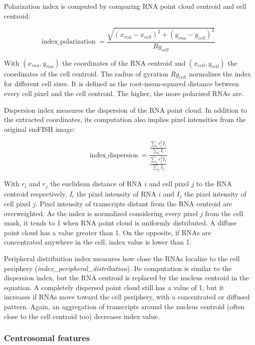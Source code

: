 Polarization index is computed by comparing \ac{RNA} point cloud centroid and cell centroid:

\begin{equation}
	{\displaystyle \operatorname{index\_polarization} = \frac{\sqrt{(x_{rna} - x_{cell})^2 + (y_{rna} - y_{cell})^2}}{Rg_{cell}}}
\end{equation}

\noindent
With $(x_{rna}, y_{rna})$ the coordinates of the \ac{RNA} centroid and $(x_{cell}, y_{cell})$ the coordinates of the cell centroid.
The radius of gyration $Rg_{cell}$ normalizes the index for different cell sizes.
It is defined as the root-mean-squared distance between every cell pixel and the cell centroid.
The higher, the more polarized \ac{RNA}s are.

Dispersion index measures the dispersion of the \ac{RNA} point cloud.
In addition to the extracted coordinates, its computation also implies pixel intensities from the original \ac{smFISH} image:

\begin{equation}
	{\displaystyle \operatorname{index\_dispersion} = \frac{\frac{\sum_{i} r_i^2 I_i}{\sum_{i} I_i}}{\frac{\sum_{j} r_j^2 I_j}{\sum_{j} I_j}}}
\end{equation}

\noindent
With $r_i$ and $r_j$ the euclidean distance of \ac{RNA} $i$ and cell pixel $j$ to the \ac{RNA} centroid respectively, $I_i$ the pixel intensity of \ac{RNA} $i$ and $I_j$ the pixel intensity of cell pixel $j$.
Pixel intensity of transcripts distant from the \ac{RNA} centroid are overweighted.
As the index is normalized considering every pixel $j$ from the cell mask, it tends to 1 when \ac{RNA} point cloud is uniformly distributed.
A diffuse point cloud has a value greater than 1.
On the opposite, if \ac{RNA}s are concentrated anywhere in the cell, index value is lower than 1.

Peripheral distribution index measures how close the \ac{RNA}s localize to the cell periphery (\emph{index\_peripheral\_distribution}).
Its computation is similar to the dispersion index, but the \ac{RNA} centroid is replaced by the nucleus centroid in the equation.
A completely dispersed point cloud still has a value of 1, but it increases if \ac{RNA}s move toward the cell periphery, with a concentrated or diffused pattern.
Again, an aggregation of transcripts around the nucleus centroid (often close to the cell centroid too) decreases index value.

\subsubsection{Centrosomal features}

